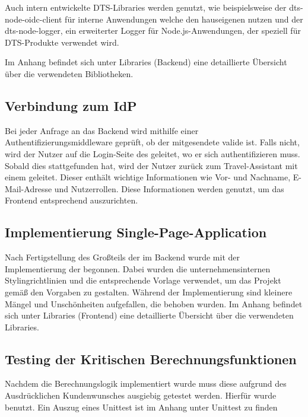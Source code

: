 Auch intern entwickelte DTS-Libraries werden genutzt, wie beispielsweise der dts-node-oidc-client für interne Anwendungen welche den hauseigenen  nutzen und der dts-node-logger, ein erweiterter Logger für Node.js-Anwendungen, der speziell für DTS-Produkte verwendet wird.

Im Anhang befindet sich unter Libraries (Backend) eine detaillierte Übersicht über die verwendeten Bibliotheken. \todo

\subsection{Verbindung zum IdP}

Bei jeder Anfrage an das Backend wird mithilfe einer Authentifizierungsmiddleware geprüft, ob der mitgesendete  valide ist. Falls nicht, wird der Nutzer auf die Login-Seite des  geleitet, wo er sich authentifizieren muss. Sobald dies stattgefunden hat, wird der Nutzer zurück zum Travel-Assistant mit einem  geleitet. Dieser  enthält wichtige Informationen wie Vor- und Nachname, E-Mail-Adresse und Nutzerrollen. Diese Informationen werden genutzt, um das Frontend entsprechend auszurichten.

\subsection{Implementierung Single-Page-Application}

Nach Fertigstellung des Großteils der  im Backend wurde mit der Implementierung der  begonnen. Dabei wurden die unternehmensinternen Stylingrichtlinien und die entsprechende Vorlage verwendet, um das Projekt gemäß den Vorgaben zu gestalten. Während der Implementierung sind kleinere Mängel und Unschönheiten aufgefallen, die behoben wurden. Im Anhang befindet sich unter Libraries (Frontend) eine detaillierte Übersicht über die verwendeten Libraries.

\subsection{Testing der Kritischen Berechnungsfunktionen}

Nachdem die Berechnungslogik implementiert wurde muss diese aufgrund des Ausdrücklichen Kundenwunsches ausgiebig getestet werden. Hierfür wurde  benutzt. Ein Auszug eines Unittest ist im Anhang unter Unittest zu finden\todo